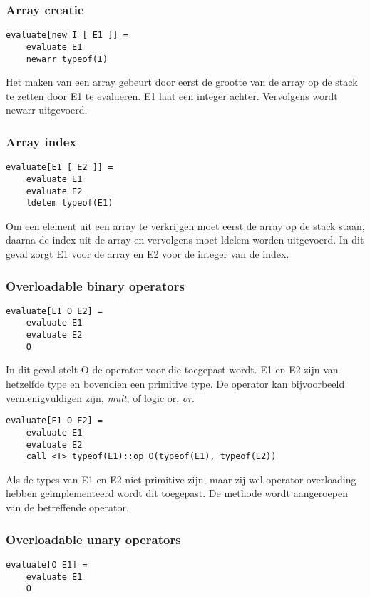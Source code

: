 \subsubsection{Array creatie}
\begin{lstlisting}
evaluate[new I [ E1 ]] =
	evaluate E1
	newarr typeof(I)
\end{lstlisting}
Het maken van een array gebeurt door eerst de grootte van de array op de stack te zetten door E1 te evalueren. E1 laat een integer achter. Vervolgens wordt newarr uitgevoerd.

\subsubsection{Array index}
\begin{lstlisting}
evaluate[E1 [ E2 ]] =
	evaluate E1
	evaluate E2
	ldelem typeof(E1)
\end{lstlisting}
Om een element uit een array te verkrijgen moet eerst de array op de stack staan, daarna de index uit de array en vervolgens moet ldelem worden uitgevoerd. In dit geval zorgt E1 voor de array en E2 voor de integer van de index.

\subsubsection{Overloadable binary operators}
\begin{lstlisting}
evaluate[E1 O E2] =
	evaluate E1
	evaluate E2
	O
\end{lstlisting}
In dit geval stelt O de operator voor die toegepast wordt. E1 en E2 zijn van hetzelfde type en bovendien een primitive type. De operator kan bijvoorbeeld vermenigvuldigen zijn, \textit{mult}, of logic or, \textit{or}.

\begin{lstlisting}
evaluate[E1 O E2] =
	evaluate E1
	evaluate E2
	call <T> typeof(E1)::op_O(typeof(E1), typeof(E2))
\end{lstlisting}
Als de types van E1 en E2 niet primitive zijn, maar zij wel operator overloading hebben ge\"implementeerd wordt dit toegepast. De methode wordt aangeroepen van de betreffende operator.

\subsubsection{Overloadable unary operators}
\begin{lstlisting}
evaluate[O E1] =
	evaluate E1
	O
\end{lstlisting}

